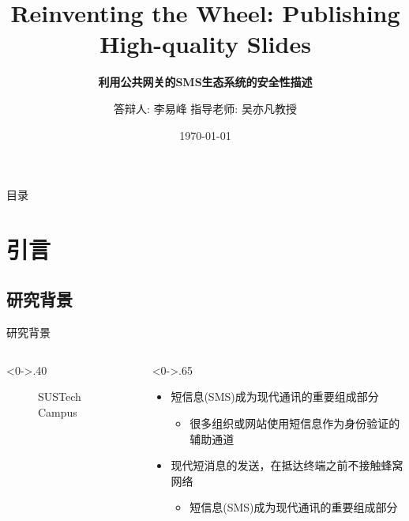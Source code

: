 \documentclass[10pt,aspectratio=43,mathserif]{beamer}
\title{Reinventing the Wheel: Publishing High-quality Slides}
\subtitle{\fontsize{9pt}{14pt}\textbf{利用公共网关的SMS生态系统的安全性描述}}
\author{答辩人: 李易峰 \newline \newline 指导老师: 吴亦凡教授}
\institute{中北大学英雄与联盟工程学院}
\date{\today}
\begin{document}

\frame{\titlepage}

\section[目录]{}   %
\begin{frame}{目录}
\tableofcontents
\end{frame}

\section{引言}  %
\subsection{研究背景}
\begin{frame}{研究背景}
\begin{columns}[T] %
\begin{column}<0->{.40\textwidth}
	\begin{figure}[thpb]
		\centering
		\caption{SUSTech Campus}
		\label{fig:campus}
	\end{figure}
\end{column}%
\hfill%
\begin{column}<0->{.65\textwidth}
	\begin{itemize}
		\item<1-> 短信息(SMS)成为现代通讯的重要组成部分
		\begin{itemize}
			\item<1-> 很多组织或网站使用短信息作为身份验证的辅助通道
		\end{itemize}
		\item<2-> 现代短消息的发送，在抵达终端之前不接触蜂窝网络
		\begin{itemize}
			\item<2-> 短信息(SMS)成为现代通讯的重要组成部分
		\end{itemize}
	\end{itemize}
\end{column}%
\end{columns}
\end{frame}
\end{document}
